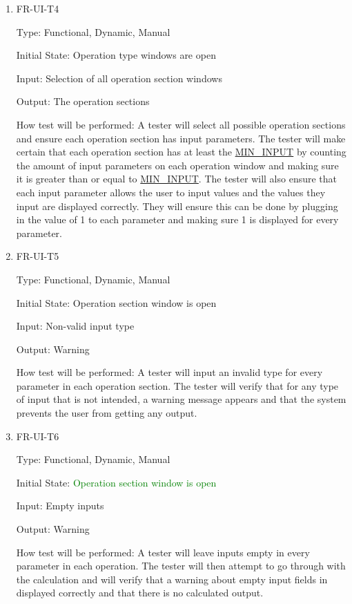 \documentclass[12pt, titlepage]{article}
\begin{document}
\begin{enumerate}
\item{FR-UI-T4\\}

Type: Functional, Dynamic, Manual
					
Initial State: Operation type windows are open
					
Input: Selection of all operation section windows
					
Output: The operation sections
					
How test will be performed: A tester will select all possible operation sections and ensure each operation section has input parameters. The tester will make certain that each operation section has at least the \hyperref[sec:sp]{MIN\_INPUT} by counting the amount of input parameters on each operation window and making sure it is greater than or equal to \hyperref[sec:sp]{MIN\_INPUT}. The tester will also ensure that each input parameter allows the user to input values and the values they input are displayed correctly. They will ensure this can be done by plugging in the value of 1 to each parameter and making sure 1 is displayed for every parameter.





\item{FR-UI-T5\\}

Type: Functional, Dynamic, Manual
					
Initial State: Operation section window is open 
					
Input: Non-valid input type
					
Output: Warning

How test will be performed: A tester will input an invalid type for every parameter in each operation section. The tester will verify that for any type of input that is not intended, a warning message appears and that the system prevents the user from getting any output.


\item{FR-UI-T6\\}

Type: Functional, Dynamic, Manual
					
Initial State: \textcolor{Green}{Operation section window is open}
					
Input: Empty inputs
					
Output: Warning

How test will be performed: A tester will leave inputs empty in every parameter in each operation. The tester will then attempt to go through with the calculation and will verify that a warning about empty input fields in displayed correctly and that there is no calculated output.






\end{enumerate}
\end{document}
